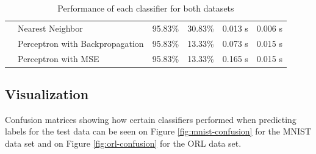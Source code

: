 \begin{table}[!htbp]
\begin{tabular}{|l|l|l|l|l|l|}
    \cline{2-6}
            & Nearest Neighbor                & 95.83\%              & 30.83\%              & 0.013 s              & 0.006 s    \\ 
    \cline{2-6}
            & Perceptron with Backpropagation & 95.83\%              & 13.33\%              & 0.073 s              & 0.015 s    \\ 
    \cline{2-6}
            & Perceptron with MSE             & 95.83\%              & 13.33\%              & 0.165 s              & 0.015 s    \\
    \hline
    \end{tabular}
    \caption{Performance of each classifier for both datasets}
    \label{tab:classifiers-performance}
\end{table}

\subsection{Visualization}
Confusion matrices showing how certain classifiers performed when predicting labels for the test data can be seen on Figure \ref{fig:mnist-confusion} for the MNIST data set and on Figure \ref{fig:orl-confusion} for the ORL data set. 

